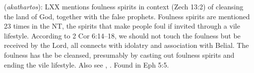 \item[Foulness,]

(\textit{akathartos}):
LXX mentions foulness spirits in context (Zech 13:2) of cleansing the land of God, together with the false prophets. Foulness spirits are mentioned 23 times in the NT, the spirits that make people foul if invited through a vile lifestyle. According to 2 Cor 6:14--18, we should not touch the foulness but be received by the Lord, all connects with idolatry and association with Belial. The foulness has the be cleansed, presumably by casting out foulness spirits and ending the vile lifestyle. Also see , .
Found in Eph 5:5.
